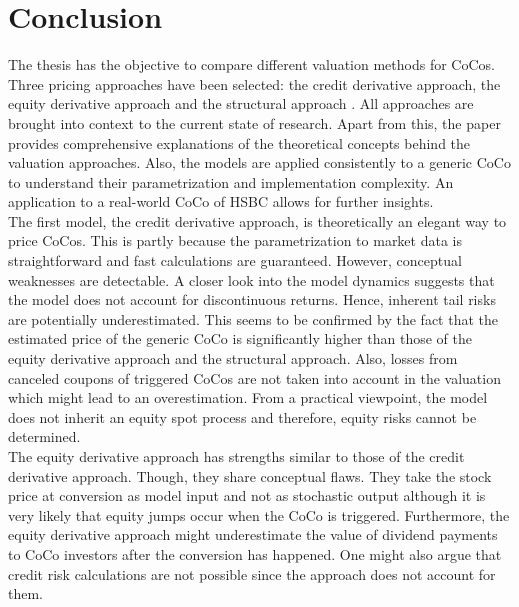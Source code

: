 \chapter{Conclusion}
The thesis has the objective to compare different valuation methods for CoCos. Three pricing approaches have been selected: the credit derivative approach, the equity derivative approach \citep{de2011pricing} and the structural approach \citep{pennacchi2010structural}. All approaches are brought into context to the current state of research. Apart from this, the paper provides comprehensive explanations of the theoretical concepts behind the valuation approaches.  Also, the models are applied consistently to a generic CoCo to understand their parametrization and implementation complexity. An application to a real-world CoCo of HSBC allows for further insights.\\

The first model, the credit derivative approach, is theoretically an elegant way to price CoCos. This is partly because the parametrization to market data is straightforward and fast calculations are guaranteed. However, conceptual weaknesses are detectable. A closer look into the model dynamics suggests that the model does not account for discontinuous returns. Hence, inherent tail risks are potentially underestimated. This seems to be confirmed by the fact that the estimated price of the generic CoCo is significantly higher than those of the equity derivative approach and the structural approach. Also, losses from canceled coupons of triggered CoCos are not taken into account in the valuation which might lead to an overestimation. From a practical viewpoint, the model does not inherit an equity spot process and therefore, equity risks cannot be determined. \citep{turfus2015cocos}\\

The equity derivative approach has strengths similar to those of the credit derivative approach. Though, they share conceptual flaws. They take the stock price at conversion as model input and not as stochastic output although it is very likely that equity jumps occur when the CoCo is triggered. \citep{turfus2015cocos} Furthermore, the equity derivative approach might underestimate the value of dividend payments to CoCo investors after the conversion has happened. One might also argue that credit risk calculations are not possible since the approach does not account for them. \citep{turfus2015cocos} \\

